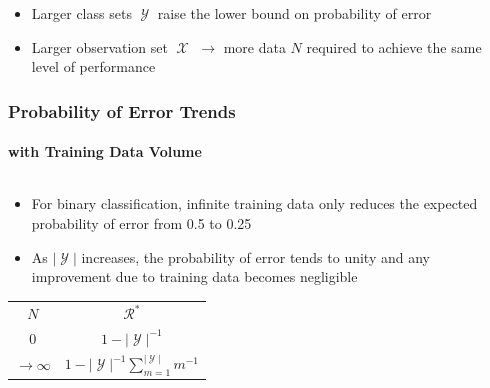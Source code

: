 \documentclass[aspectratio=169]{beamer}
\DeclareMathOperator{\Xcal}{\mathcal{X}}
\DeclareMathOperator{\Ycal}{\mathcal{Y}}
\DeclareMathOperator{\Rcal}{\mathcal{R}}
\begin{document}
\begin{frame}
\begin{columns}[c]
\begin{column}{.5\linewidth}
\end{column}

\end{columns}

\begin{itemize}
\item Larger class sets $\Ycal$ raise the lower bound on probability of error
\item Larger observation set $\Xcal$ $\longrightarrow$ more data $N$ required to achieve the same level of performance
\end{itemize}

\end{frame}




\begin{frame}
\frametitle{Probability of Error Trends}
\framesubtitle{with Training Data Volume}

\begin{columns}[c]

\begin{column}{.5\linewidth}

\begin{itemize}
\item For binary classification, infinite training data only reduces the expected probability of error from 0.5 to 0.25
\item As $|\Ycal|$ increases, the probability of error tends to unity and any improvement due to training data becomes negligible
\end{itemize}

\begin{table}
\renewcommand{\arraystretch}{1.3}
\begin{tabular}{| c | c |}
\hline 
$N$ & $\Rcal^*$ \\
\hhline{|=|=|}
$0$ & $1 - |\Ycal|^{-1}$  \\ 
\hline
$\to \infty$ & $1 - |\Ycal|^{-1} \sum_{m=1}^{|\Ycal|} m^{-1}$ \\
\hline
\end{tabular}
\end{table}

\end{column}

\begin{column}{.5\linewidth}


\end{column}
\end{columns}
\end{frame}
\end{document}
